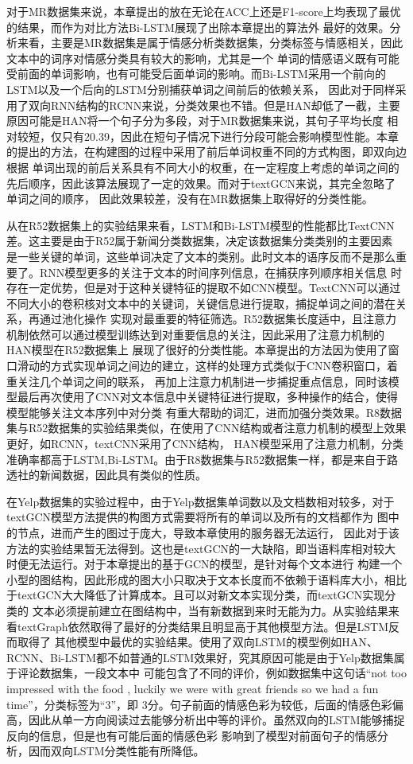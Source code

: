 对于MR数据集来说，本章提出的放在无论在ACC上还是F1-score上均表现了最优的结果，而作为对比方法Bi-LSTM展现了出除本章提出的算法外
最好的效果。分析来看，主要是MR数据集是属于情感分析类数据集，分类标签与情感相关，因此文本中的词序对情感分类具有较大的影响，尤其是一个
单词的情感语义既有可能受前面的单词影响，也有可能受后面单词的影响。而Bi-LSTM采用一个前向的LSTM以及一个后向的LSTM分别捕获单词之间前后的依赖关系，
因此对于同样采用了双向RNN结构的RCNN来说，分类效果也不错。但是HAN却低了一截，主要原因可能是HAN将一个句子分为多段，对于MR数据集来说，其句子平均长度
相对较短，仅只有20.39，因此在短句子情况下进行分段可能会影响模型性能。本章的提出的方法，在构建图的过程中采用了前后单词权重不同的方式构图，即双向边根据
单词出现的前后关系具有不同大小的权重，在一定程度上考虑的单词之间的先后顺序，因此该算法展现了一定的效果。而对于textGCN来说，其完全忽略了单词之间的顺序，
因此效果较差，没有在MR数据集上取得好的分类性能。

从在R52数据集上的实验结果来看，LSTM和Bi-LSTM模型的性能都比TextCNN差。这主要是由于R52属于新闻分类数据集，决定该数据集分类类别的主要因素
是一些关键的单词，这些单词决定了文本的类别。此时文本的语序反而不是那么重要了。RNN模型更多的关注于文本的时间序列信息，在捕获序列顺序相关信息
时存在一定优势，但是对于这种关键特征的提取不如CNN模型。TextCNN可以通过不同大小的卷积核对文本中的关键词，关键信息进行提取，捕捉单词之间的潜在关系，再通过池化操作
实现对最重要的特征筛选。R52数据集长度适中，且注意力机制依然可以通过模型训练达到对重要信息的关注，因此采用了注意力机制的HAN模型在R52数据集上
展现了很好的分类性能。本章提出的方法因为使用了窗口滑动的方式实现单词之间边的建立，这样的处理方式类似于CNN卷积窗口，着重关注几个单词之间的联系，
再加上注意力机制进一步捕捉重点信息，同时该模型最后再次使用了CNN对文本信息中关键特征进行提取，多种操作的结合，使得模型能够关注文本序列中对分类
有重大帮助的词汇，进而加强分类效果。R8数据集与R52数据集的实验结果类似，在使用了CNN结构或者注意力机制的模型上效果更好，如RCNN，textCNN采用了CNN结构，
HAN模型采用了注意力机制，分类准确率都高于LSTM,Bi-LSTM。由于R8数据集与R52数据集一样，都是来自于路透社的新闻数据，因此具有类似的性质。

在Yelp数据集的实验过程中，由于Yelp数据集单词数以及文档数相对较多，对于textGCN模型方法提供的构图方式需要将所有的单词以及所有的文档都作为
图中的节点，进而产生的图过于庞大，导致本章使用的服务器无法运行，
因此对于该方法的实验结果暂无法得到。这也是textGCN的一大缺陷，即当语料库相对较大时便无法运行。对于本章提出的基于GCN的模型，是针对每个文本进行
构建一个小型的图结构，因此形成的图大小只取决于文本长度而不依赖于语料库大小，相比于textGCN大大降低了计算成本。且可以对新文本实现分类，而textGCN实现分类的
文本必须提前建立在图结构中，当有新数据到来时无能为力。从实验结果来看textGraph依然取得了最好的分类结果且明显高于其他模型方法。但是LSTM反而取得了
其他模型中最优的实验结果。使用了双向LSTM的模型例如HAN、RCNN、Bi-LSTM都不如普通的LSTM效果好，究其原因可能是由于Yelp数据集属于评论数据集，一段文本中
可能包含了不同的评价，例如数据集中这句话“not too impressed with the food , luckily we were with great friends so we had a fun time”，分类标签为“3”，即
3分。句子前面的情感色彩为较低，后面的情感色彩偏高，因此从单一方向阅读过去能够分析出中等的评价。虽然双向的LSTM能够捕捉反向的信息，但是也有可能后面的情感色彩
影响到了模型对前面句子的情感分析，因而双向LSTM分类性能有所降低。

